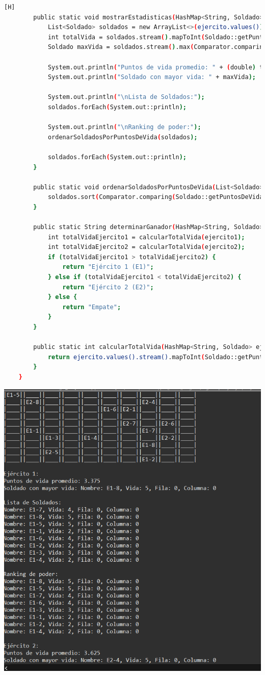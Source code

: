 \documentclass{article}
\begin{document}
\begin{lstlisting}[language=bash,caption={Creando la clase principal de VideoJuego_v5.java}][H]
	    public static void mostrarEstadisticas(HashMap<String, Soldado> ejercito) {
	        List<Soldado> soldados = new ArrayList<>(ejercito.values());
	        int totalVida = soldados.stream().mapToInt(Soldado::getPuntosDeVida).sum();
	        Soldado maxVida = soldados.stream().max(Comparator.comparing(Soldado::getPuntosDeVida)).orElse(null);

	        System.out.println("Puntos de vida promedio: " + (double) totalVida / soldados.size());
	        System.out.println("Soldado con mayor vida: " + maxVida);

	        System.out.println("\nLista de Soldados:");
	        soldados.forEach(System.out::println);

	        System.out.println("\nRanking de poder:");
	        ordenarSoldadosPorPuntosDeVida(soldados);

	        soldados.forEach(System.out::println);
	    }

	    public static void ordenarSoldadosPorPuntosDeVida(List<Soldado> soldados) {
	        soldados.sort(Comparator.comparing(Soldado::getPuntosDeVida).reversed());
	    }

	    public static String determinarGanador(HashMap<String, Soldado> ejercito1, HashMap<String, Soldado> ejercito2) {
	        int totalVidaEjercito1 = calcularTotalVida(ejercito1);
	        int totalVidaEjercito2 = calcularTotalVida(ejercito2);
	        if (totalVidaEjercito1 > totalVidaEjercito2) {
	            return "Ejército 1 (E1)";
	        } else if (totalVidaEjercito1 < totalVidaEjercito2) {
	            return "Ejército 2 (E2)";
	        } else {
	            return "Empate";
	        }
	    }

	    public static int calcularTotalVida(HashMap<String, Soldado> ejercito) {
	        return ejercito.values().stream().mapToInt(Soldado::getPuntosDeVida).sum();
	    }
	}

				\end{lstlisting}
			
			\includegraphics[scale=1]{img/Captura 1.PNG} 
		
\end{document}
